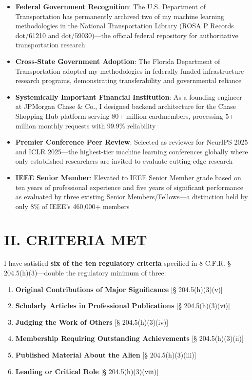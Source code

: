 \documentclass[11pt]{article}
\begin{document}
\begin{itemize}
    \item \textbf{Federal Government Recognition}: The U.S. Department of Transportation has permanently archived two of my machine learning methodologies in the National Transportation Library (ROSA P Records dot/61210 and dot/59030)—the official federal repository for authoritative transportation research
    
    \item \textbf{Cross-State Government Adoption}: The Florida Department of Transportation adopted my methodologies in federally-funded infrastructure research programs, demonstrating transferability and governmental reliance
    
    \item \textbf{Systemically Important Financial Institution}: As a founding engineer at JPMorgan Chase \& Co., I designed backend architecture for the Chase Shopping Hub platform serving 80+ million cardmembers, processing 5+ million monthly requests with 99.9\% reliability
    
    \item \textbf{Premier Conference Peer Review}: Selected as reviewer for NeurIPS 2025 and ICLR 2025—the highest-tier machine learning conferences globally where only established researchers are invited to evaluate cutting-edge research
    
    \item \textbf{IEEE Senior Member}: Elevated to IEEE Senior Member grade based on ten years of professional experience and five years of significant performance as evaluated by three existing Senior Members/Fellows—a distinction held by only 8\% of IEEE's 460,000+ members
\end{itemize}

\section*{II. CRITERIA MET}

I have satisfied \textbf{six of the ten regulatory criteria} specified in 8 C.F.R. § 204.5(h)(3)—double the regulatory minimum of three:

\begin{enumerate}
    \item \textbf{Original Contributions of Major Significance} [§ 204.5(h)(3)(v)]
    \item \textbf{Scholarly Articles in Professional Publications} [§ 204.5(h)(3)(vi)]
    \item \textbf{Judging the Work of Others} [§ 204.5(h)(3)(iv)]
    \item \textbf{Membership Requiring Outstanding Achievements} [§ 204.5(h)(3)(ii)]
    \item \textbf{Published Material About the Alien} [§ 204.5(h)(3)(iii)]
    \item \textbf{Leading or Critical Role} [§ 204.5(h)(3)(viii)]
\end{enumerate}
\end{document}
